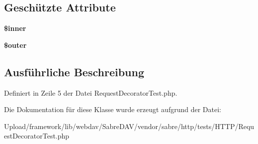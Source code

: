 \subsection*{Geschützte Attribute}
\begin{DoxyCompactItemize}
\item 
\mbox{\label{class_sabre_1_1_h_t_t_p_1_1_request_decorator_test_afb632664b6de14601b2154d7266717ad}} 
{\bfseries \$inner}
\item 
\mbox{\label{class_sabre_1_1_h_t_t_p_1_1_request_decorator_test_a9856d3eb9d152a0ef5128ad3d8389e2d}} 
{\bfseries \$outer}
\end{DoxyCompactItemize}


\subsection{Ausführliche Beschreibung}


Definiert in Zeile 5 der Datei Request\+Decorator\+Test.\+php.



Die Dokumentation für diese Klasse wurde erzeugt aufgrund der Datei\+:\begin{DoxyCompactItemize}
\item 
Upload/framework/lib/webdav/\+Sabre\+D\+A\+V/vendor/sabre/http/tests/\+H\+T\+T\+P/Request\+Decorator\+Test.\+php\end{DoxyCompactItemize}
